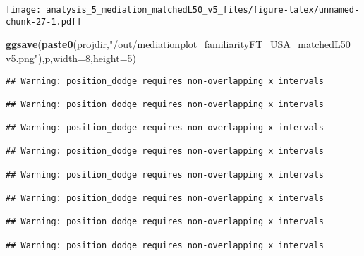 \documentclass[
]{article}
\newenvironment{Shaded}{\begin{snugshade}}{\end{snugshade}}
\newcommand{\DataTypeTok}[1]{\textcolor[rgb]{0.13,0.29,0.53}{#1}}
\newcommand{\DecValTok}[1]{\textcolor[rgb]{0.00,0.00,0.81}{#1}}
\newcommand{\KeywordTok}[1]{\textcolor[rgb]{0.13,0.29,0.53}{\textbf{#1}}}
\newcommand{\NormalTok}[1]{#1}
\newcommand{\StringTok}[1]{\textcolor[rgb]{0.31,0.60,0.02}{#1}}
\begin{document}
\texttt{[image: analysis\_5\_mediation\_matchedL50\_v5\_files/figure-latex/unnamed-chunk-27-1.pdf]}

\begin{Shaded}
\begin{Highlighting}[]
\KeywordTok{ggsave}\NormalTok{(}\KeywordTok{paste0}\NormalTok{(projdir,}\StringTok{"/out/mediationplot_familiarityFT_USA_matchedL50_v5.png"}\NormalTok{),p,}\DataTypeTok{width=}\DecValTok{8}\NormalTok{,}\DataTypeTok{height=}\DecValTok{5}\NormalTok{)}
\end{Highlighting}
\end{Shaded}

\begin{verbatim}
## Warning: position_dodge requires non-overlapping x intervals

## Warning: position_dodge requires non-overlapping x intervals

## Warning: position_dodge requires non-overlapping x intervals

## Warning: position_dodge requires non-overlapping x intervals

## Warning: position_dodge requires non-overlapping x intervals

## Warning: position_dodge requires non-overlapping x intervals

## Warning: position_dodge requires non-overlapping x intervals

## Warning: position_dodge requires non-overlapping x intervals
\end{verbatim}
\end{document}
